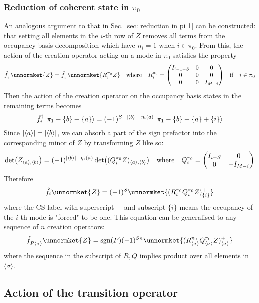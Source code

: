 \documentclass[12pt]{article}
\newcommand{\sgn}{\text{sgn}}
\newcommand{\seq}[1]{\langle #1\rangle}
\newcommand{\hc}{^\dagger}
\begin{document}
	\subsubsection{Reduction of coherent state in $\pi_0$}
	An analogous argument to that in Sec. \ref{sec: reduction in pi 1} can be constructed: that setting all elements in the $i$-th row of $Z$ removes all terms from the occupancy basis decomposition which have $n_i=1$ when $i\in\pi_0$. From this, the action of the creation operator acting on a mode in $\pi_0$ satisfies the property
	\begin{equation}
	\hat{f}\hc_i\unnormket{Z}=\hat{f}\hc_i\unnormket{R^{\pi_0}_iZ}\qq{where}R^{\pi_0}_i=\mqty(\dmat[0]{I_{i-1-S}, 0, I_{M-i}})\qq{if}i\in\pi_0
	\end{equation}
	Then the action of the creation operator on the occupancy basis states in the remaining terms becomes
	\begin{equation}
	\hat{f}\hc_i\ket{\pi_1-\{b\}+\{a\}}=(-1)^{S-\abs{\seq{b}}+\eta_i(a)}\ket{\pi_1-\{b\}+\{a\}+\{i\}}
	\end{equation}
	Since $\abs{\seq{a}}=\abs{\seq{b}}$, we can absorb a part of the sign prefactor into the corresponding minor of $Z$ by transforming $Z$ like so:
	\begin{equation}
	\det(Z_{\seq{a},\seq{b}})=(-1)^{\abs{\seq{b}}-\eta_i(a)}\det((Q^{\pi_0}_iZ)_{\seq{a},\seq{b}})\qq{where}Q^{\pi_0}_i=\mqty(\dmat[0]{I_{i-S}, -I_{M-i}})
	\end{equation}
	Therefore
	\begin{equation}
	\hat{f}_i\unnormket{Z}=(-1)^{S}\unnormket{(R^{\pi_0}_iQ^{\pi_0}_iZ)^+_{\{i\}}}
	\end{equation}
	where the CS label with superscript $+$ and subscript $\{i\}$ means the occupancy of the $i$-th mode is "forced" to be one. This equation can be generalised to any sequence of $n$ creation operators:
	\begin{equation} \label{eq:effect of pi_0 lowering operator}
	\hat{f}\hc_{P\seq{\sigma}}\unnormket{Z}=\sgn(P)(-1)^{Sn}\unnormket{(R^{\pi_0}_{\seq{\sigma}}Q^{\pi_0}_{\seq{\sigma}}Z)^{+}_{\seq{\sigma}}}
	\end{equation}
	where the sequence in the subscript of $R, Q$ implies product over all elements in $\seq{\sigma}$.
	
	\subsection{Action of the transition operator}
	
\end{document}
